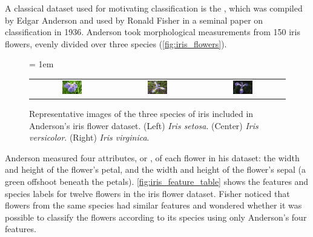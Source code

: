 A classical dataset used for motivating classification is the , which was compiled by Edgar Anderson and used by Ronald Fisher in a seminal paper on classification in 1936. Anderson took morphological measurements from 150 iris flowers, evenly divided over three species (\autoref{fig:iris_flowers}).\\

\begin{figure}[h]
\centering
\tabcolsep = 1em
\mySfFamily
\begin{tabular}{c c c}
\includegraphics[width = 0.25\textwidth]{../images/Iris_setosa_2.jpg} & \includegraphics[width = 0.25\textwidth]{../images/Iris_versicolor.jpg} & \includegraphics[width = 0.25\textwidth]{../images/Iris_virginica.jpg}
\end{tabular}
\caption{Representative images of the three species of iris included in Anderson's iris flower dataset. (Left) \textit{Iris setosa}. (Center)  \textit{Iris versicolor}. (Right) \textit{Iris virginica}.}
\label{fig:iris_flowers}
\end{figure}

Anderson measured four attributes, or , of each flower in his dataset: the width and height of the flower's petal, and the width and height of the flower's sepal (a green offshoot beneath the petals). \autoref{fig:iris_feature_table} shows the features and species labels for twelve flowers in the iris flower dataset. Fisher noticed that flowers from the same species had similar features and wondered whether it was possible to classify the flowers according to its species using only Anderson's four features.\\


